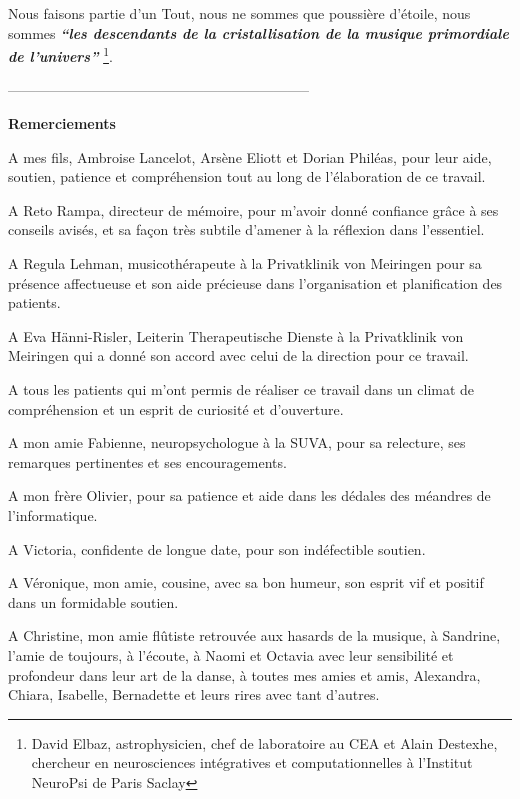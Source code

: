 Nous faisons partie d'un Tout, nous ne sommes que poussière d'étoile,
nous sommes
\textit{\textbf{``les descendants de la  cristallisation de la musique primordiale de
l'univers''}} \autocite{delbaz_recherche_2016} \footnote{David Elbaz, astrophysicien, chef de laboratoire au CEA et Alain
Destexhe, chercheur en neurosciences intégratives et computationnelles
à l'Institut  NeuroPsi de Paris Saclay}.







-----------------------------------------------------------------







\textbf{Remerciements}


A mes fils, Ambroise Lancelot, Arsène Eliott et Dorian Philéas, pour leur aide, soutien, patience et compréhension tout au long de l'élaboration de ce travail.

A Reto Rampa, directeur de mémoire,
pour m'avoir donné confiance grâce à ses conseils
avisés, et sa façon très subtile d'amener à la réflexion dans l'essentiel.

A Regula Lehman, musicothérapeute à la Privatklinik von Meiringen pour sa présence affectueuse et son aide précieuse dans l'organisation et planification des patients.

A Eva Hänni-Risler, Leiterin Therapeutische Dienste à la Privatklinik von Meiringen qui a donné son accord avec celui de la direction pour ce travail.

A tous les patients qui m'ont permis de réaliser ce travail dans un climat de compréhension et un esprit de curiosité et d'ouverture.

A mon amie Fabienne, neuropsychologue à la SUVA, pour sa relecture, ses remarques pertinentes et ses encouragements.

A mon frère Olivier, pour sa patience et aide dans les dédales des méandres de l'informatique.

A Victoria, confidente de longue date, pour son indéfectible soutien.

A Véronique, mon amie, cousine, avec sa bon humeur, son esprit vif et positif dans un formidable soutien.

A Christine, mon amie flûtiste retrouvée aux hasards de la musique, à Sandrine, l'amie de toujours, à l'écoute, à Naomi et Octavia avec leur sensibilité et profondeur dans leur art de la danse, à toutes mes amies et amis, Alexandra, Chiara, Isabelle, Bernadette et leurs rires avec tant d'autres.


